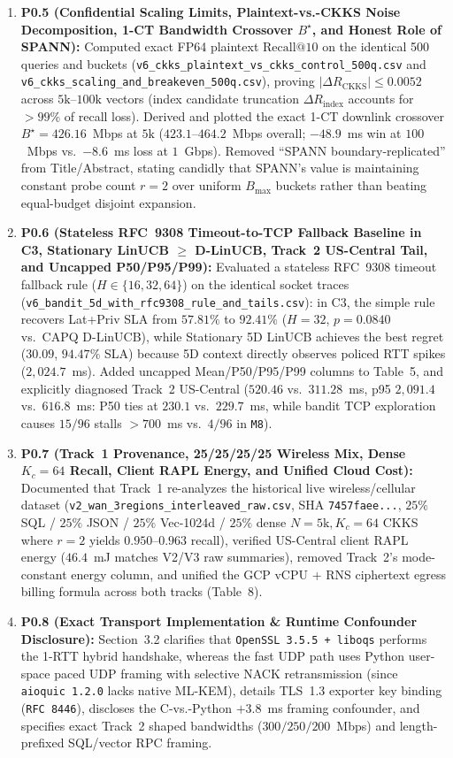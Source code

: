 \documentclass[10pt]{article}
\begin{document}
\begin{enumerate}
    \item \textbf{P0.5 (Confidential Scaling Limits, Plaintext-vs.-CKKS Noise Decomposition, 1-CT Bandwidth Crossover $B^\star$, and Honest Role of SPANN):} Computed exact FP64 plaintext $\mathrm{Recall}@10$ on the identical 500 queries and buckets (\nolinkurl{v6_ckks_plaintext_vs_ckks_control_500q.csv} and \nolinkurl{v6_ckks_scaling_and_breakeven_500q.csv}), proving $|\Delta R_{\text{CKKS}}| \le 0.0052$ across $5\text{k}\text{--}100\text{k}$ vectors (index candidate truncation $\Delta R_{\text{index}}$ accounts for $>99\%$ of recall loss). Derived and plotted the exact 1-CT downlink crossover $B^\star = 426.16$~Mbps at $5\text{k}$ ($423.1\text{--}464.2$~Mbps overall; $-48.9$~ms win at $100$~Mbps vs.\ $-8.6$~ms loss at $1$~Gbps). Removed ``SPANN boundary-replicated'' from Title/Abstract, stating candidly that SPANN's value is maintaining constant probe count $r=2$ over uniform $B_{\max}$ buckets rather than beating equal-budget disjoint expansion.
    \item \textbf{P0.6 (Stateless RFC~9308 Timeout-to-TCP Fallback Baseline in C3, Stationary LinUCB $\ge$ D-LinUCB, Track~2 US-Central Tail, and Uncapped P50/P95/P99):} Evaluated a stateless RFC~9308 timeout fallback rule ($H \in \{16,32,64\}$) on the identical socket traces (\nolinkurl{v6_bandit_5d_with_rfc9308_rule_and_tails.csv}): in C3, the simple rule recovers Lat+Priv SLA from $57.81\%$ to $92.41\%$ ($H=32$, $p=0.0840$ vs.\ CAPQ D-LinUCB), while Stationary 5D LinUCB achieves the best regret ($30.09$, $94.47\%$ SLA) because 5D context directly observes policed RTT spikes ($2{,}024.7$~ms). Added uncapped Mean/P50/P95/P99 columns to Table~5, and explicitly diagnosed Track~2 US-Central ($520.46$ vs.\ $311.28$~ms, p95 $2{,}091.4$ vs.\ $616.8$~ms: P50 ties at $230.1$ vs.\ $229.7$~ms, while bandit TCP exploration causes $15/96$ stalls $>700$~ms vs.\ $4/96$ in \texttt{M8}).
    \item \textbf{P0.7 (Track~1 Provenance, 25/25/25/25 Wireless Mix, Dense $K_c=64$ Recall, Client RAPL Energy, and Unified Cloud Cost):} Documented that Track~1 re-analyzes the historical live wireless/cellular dataset (\nolinkurl{v2_wan_3regions_interleaved_raw.csv}, SHA \texttt{7457faee...}, $25\%$ SQL / $25\%$ JSON / $25\%$ Vec-1024d / $25\%$ dense $N=5\text{k}, K_c=64$ CKKS where $r=2$ yields $0.950\text{--}0.963$ recall), verified US-Central client RAPL energy ($46.4$~mJ matches V2/V3 raw summaries), removed Track~2's mode-constant energy column, and unified the GCP vCPU + RNS ciphertext egress billing formula across both tracks (Table~8).
    \item \textbf{P0.8 (Exact Transport Implementation \& Runtime Confounder Disclosure):} Section~3.2 clarifies that \texttt{OpenSSL~3.5.5 + liboqs} performs the 1-RTT hybrid handshake, whereas the fast UDP path uses Python user-space paced UDP framing with selective NACK retransmission (since \texttt{aioquic~1.2.0} lacks native ML-KEM), details TLS~1.3 exporter key binding (\texttt{RFC~8446}), discloses the C-vs.-Python $+3.8$~ms framing confounder, and specifies exact Track~2 shaped bandwidths ($300/250/200$~Mbps) and length-prefixed SQL/vector RPC framing.
\end{enumerate}
\end{document}
